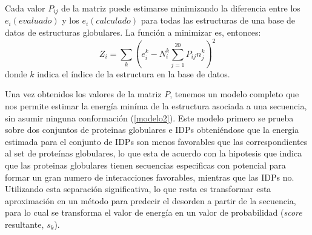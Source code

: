 Cada valor $P_{ij}$ de la matriz puede estimarse minimizando la diferencia entre los $e_i(evaluado)$ y los $e_i(calculado)$ para todas las estructuras de una base de datos de estructuras globulares.
La función a minimizar es, entonces: 
\begin{equation}\label{z}
Z_i = \sum_{k} (e_i^k - N_i^k\sum_{j=1}^{20} P_{ij}n_{j}^k)^2   
\end{equation}
\noindent donde $k$ indica el índice de la estructura en la base de datos. 



Una vez obtenidos los valores de la matriz $P$, tenemos un modelo completo que nos permite estimar la energía miníma de la estructura asociada a una secuencia, sin asumir ninguna conformación (\ref{modelo2}).
Este modelo primero se prueba sobre dos conjuntos de proteinas globulares e IDPs obteniéndose que la energia estimada para el conjunto de IDPs son menos favorables que las correspondientes al set de proteínas globulares,
lo que esta de acuerdo con la hipotesis que indica que las proteinas globulares tienen secuencias especificas con potencial para formar un gran numero de interacciones favorables, mientras que las IDPs no.
Utilizando esta separación significativa, lo que resta es transformar esta aproximación en un método para predecir el desorden a partir de la secuencia, 
para lo cual se transforma el valor de energía en un valor de probabilidad (\textit{score} resultante, $s_k$).




